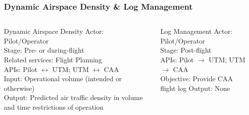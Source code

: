 \documentclass[usenames,dvipsnames,aspectratio=169,serif]{beamer}
\begin{document}
\begin{frame}
   \frametitle{Dynamic Airspace Density \& Log Management}
   \begin{columns}[t]
      \begin{column}{0.5\textwidth}
         \begin{block}{Dynamic Airspace Density}
         Actor: Pilot/Operator \\
         Stage: Pre- or during-flight \\
         Related services: Flight Planning \\
         APIs: Pilot $\leftrightarrow$ UTM; UTM $\leftrightarrow$ CAA \\
         Input: Operational volume (intended or otherwise) \\
         Output: Predicted air traffic density in volume and time restrictions of operation
         \end{block}
      \end{column}
      \begin{column}{0.5\textwidth}
         \begin{block}{Log Management}
         Actor: Pilot/Operator \\
         Stage: Post-flight \\
         APIs: Pilot $\rightarrow$ UTM; UTM $\rightarrow$ CAA \\
         Objective: Provide CAA flight log
         Output: None
         \end{block}
      \end{column}
   \end{columns}
\end{frame}
\end{document}

